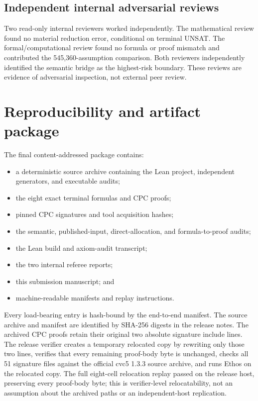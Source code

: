 \documentclass[11pt]{article}
\theoremstyle{definition}
\begin{document}
\subsection{Independent internal adversarial reviews}

Two read-only internal reviewers worked independently. The mathematical
review found no material reduction error, conditional on terminal UNSAT. The
formal/computational review found no formula or proof mismatch and contributed
the 545,360-assumption comparison. Both reviewers independently identified
the semantic bridge as the highest-risk boundary. These reviews are evidence
of adversarial inspection, not external peer review.

\section{Reproducibility and artifact package}\label{sec:artifacts}

The final content-addressed package contains:
\begin{itemize}[leftmargin=1.8em]
  \item a deterministic source archive containing the Lean project,
  independent generators, and executable audits;
  \item the eight exact terminal formulas and CPC proofs;
  \item pinned CPC signatures and tool acquisition hashes;
  \item the semantic, published-input, direct-allocation, and
  formula-to-proof audits;
  \item the Lean build and axiom-audit transcript;
  \item the two internal referee reports;
  \item this submission manuscript; and
  \item machine-readable manifests and replay instructions.
\end{itemize}

Every load-bearing entry is hash-bound by the end-to-end manifest. The source
archive and manifest are identified by SHA-256 digests in the release notes.
The archived CPC proofs retain their original two absolute signature include
lines. The release verifier creates a temporary relocated copy by rewriting
only those two lines, verifies that every remaining proof-body byte is
unchanged, checks all 51 signature files against the official cvc5 1.3.3
source archive, and runs Ethos on the relocated copy. The full eight-cell
relocation replay passed on the release host, preserving every proof-body byte;
this is verifier-level relocatability, not an assumption about the archived
paths or an independent-host replication.
\end{document}
